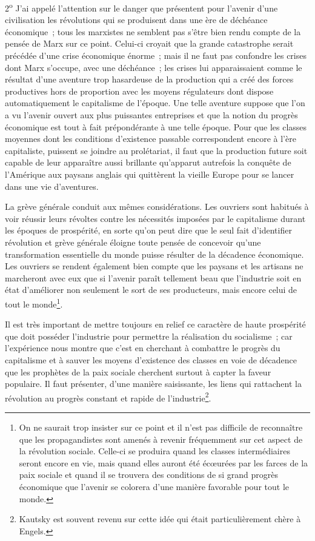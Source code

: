 \documentclass[french,twoside]{book} %
\begin{document}
2\textsuperscript{o} J’ai appelé l’attention sur le danger que présentent pour l’avenir d’une civilisation les révolutions qui se produisent dans une ère de déchéance économique ; tous les marxistes ne semblent pas s’être bien rendu compte de la pensée de Marx sur ce point. Celui-ci croyait que la grande catastrophe serait précédée d’une crise économique énorme ; mais il ne faut pas confondre les crises dont Marx s’occupe, avec une déchéance ; les crises lui apparaissaient comme le résultat d’une aventure trop hasardeuse de la production qui a créé des forces productives hors de proportion avec les moyens régulateurs dont dispose automatiquement le capitalisme de l’époque. Une telle aventure suppose que l’on a vu l’avenir ouvert aux plus puissantes entreprises et que la notion du progrès économique est tout à fait prépondérante à une telle époque. Pour que les classes moyennes dont les conditions d’existence passable correspondent encore à l’ère capitaliste, puissent se joindre au prolétariat, il faut que la production  future soit capable de leur apparaître aussi brillante qu’apparut autrefois la conquête de l’Amérique aux paysans anglais qui quittèrent la vieille Europe pour se lancer dans une vie d’aventures.\par
La grève générale conduit aux mêmes considérations. Les ouvriers sont habitués à voir réussir leurs révoltes contre les nécessités imposées par le capitalisme durant les époques de prospérité, en sorte qu’on peut dire que le seul fait d’identifier révolution et grève générale éloigne toute pensée de concevoir qu’une transformation essentielle du monde puisse résulter de la décadence économique. Les ouvriers se rendent également bien compte que les paysans et les artisans ne marcheront avec eux que si l’avenir paraît tellement beau que l’industrie soit en état d’améliorer non seulement le sort de ses producteurs, mais encore celui de tout le monde\footnote{ \noindent On ne saurait trop insister sur ce point et il n’est pas difficile de reconnaître que les propagandistes sont amenés à revenir fréquemment sur cet aspect de la révolution sociale. Celle-ci se produira quand les classes intermédiaires seront encore en vie, mais quand elles auront été écœurées par les farces de la paix sociale et quand il se trouvera des conditions de si grand progrès économique que l’avenir se colorera d’une manière favorable pour tout le monde.
 }.\par
Il est très important de mettre toujours en relief ce caractère de haute prospérité que doit posséder l’industrie pour permettre la réalisation du socialisme ; car l’expérience nous montre que c’est en cherchant à combattre le progrès du capitalisme et à sauver les moyens d’existence des classes en voie de décadence que les prophètes de la paix sociale cherchent surtout à capter la faveur populaire.  Il faut présenter, d’une manière saisissante, les liens qui rattachent la révolution au progrès constant et rapide de l’industrie\footnote{ \noindent Kautsky est souvent revenu sur cette idée qui était particulièrement chère à Engels.
 }.\par
\end{document}

